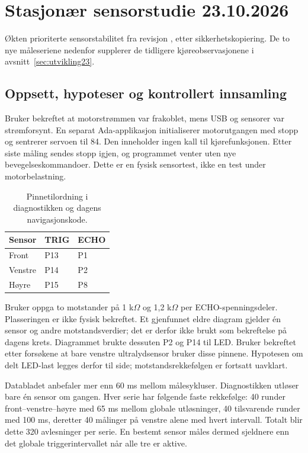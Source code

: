 \clearpage
\section{Stasjonær sensorstudie 23.10.2026}\label{sec:sensorstudie23}
Økten prioriterte sensorstabilitet fra revisjon , etter
sikkerhetskopiering. De to nye måleseriene nedenfor supplerer de
tidligere kjøreobservasjonene i avsnitt~\ref{sec:utvikling23}.

\subsection{Oppsett, hypoteser og kontrollert innsamling}
Bruker bekreftet at motorstrømmen var frakoblet, mens USB og sensorer var
strømforsynt. En separat Ada-applikasjon initialiserer motorutgangen med
stopp og sentrerer servoen til 84\textdegree{}. Den inneholder ingen kall
til kjørefunksjonen. Etter siste måling sendes stopp igjen, og programmet
venter uten nye bevegelseskommandoer. Dette er en fysisk sensortest,
ikke en test under motorbelastning.

\begin{table}[htbp]
\centering\small
\caption{Pinnetilordning i diagnostikken og dagens navigasjonskode.}
\begin{tabular}{lll}\toprule
Sensor & TRIG & ECHO \\\midrule
Front & P13 & P1 \\
Venstre & P14 & P2 \\
Høyre & P15 & P8 \\\bottomrule
\end{tabular}
\end{table}
Bruker oppga to motstander på 1 k\(\Omega\) og 1,2 k\(\Omega\) per
ECHO-spenningsdeler. Plasseringen er ikke fysisk bekreftet. Et gjenfunnet
eldre diagram gjelder én sensor og andre motstandsverdier; det er derfor
ikke brukt som bekreftelse på dagens krets. Diagrammet brukte dessuten
P2 og P14 til LED. Bruker bekreftet etter forsøkene at bare venstre
ultralydsensor bruker disse pinnene. Hypotesen om delt LED-last legges
derfor til side; motstandsrekkefølgen er fortsatt uavklart.

Databladet anbefaler mer enn 60 ms mellom målesykluser\cite{hcsr04}.
Diagnostikken utløser bare én sensor om gangen. Hver serie har følgende
faste rekkefølge: 40 runder front--venstre--høyre med 65 ms mellom globale
utløsninger, 40 tilsvarende runder med 100 ms, deretter 40 målinger på
venstre alene med hvert intervall. Totalt blir dette 320 avlesninger per
serie. En bestemt sensor måles dermed sjeldnere enn det globale
triggerintervallet når alle tre er aktive.

